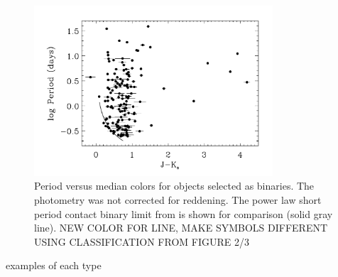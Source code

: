 \documentclass[]{emulateapj}
\begin{document}
\begin{figure}[!h]
\centering
\includegraphics[width=3.5in]{new_plots/color_period_bb}
\caption{Period versus median colors for objects selected as binaries. The photometry was not corrected for reddening. The power law short period contact binary limit from \cite{deb2011} is shown for comparison (solid gray line). NEW COLOR FOR LINE, MAKE SYMBOLS DIFFERENT USING CLASSIFICATION FROM FIGURE 2/3}
\label{periods}
\end{figure}


examples of each type
\end{document}
